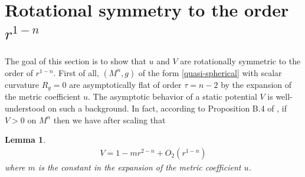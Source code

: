 \documentclass[12pt,twoside]{article}
\theoremstyle{plain}
\newtheorem{lem}[theorem]{Lemma}
\theoremstyle{definition}
\theoremstyle{remark}
\numberwithin{equation}{section}
\begin{document}
\section{Rotational symmetry to the order $r^{1-n}$}\label{section:rotational symmetry at the order}
The goal of this section is to show that $u$ and $V$ are rotationally symmetric to the order of $r^{1-n}$. First of all, $(M^{n},g)$ of the form \eqref{quasi-spherical} with scalar curvature $R_{g}=0$ are asymptotically flat of order $\tau = n-2$ by the expansion of the metric coefficient $u$. The asymptotic behavior of a static potential $V$ is well-understood on such a background. In fact, according to Proposition B.4 of \cite{HMM}, if $V >0$ on $M^{n}$ then we have after scaling that
\begin{lem}
\begin{align*}
    V = 1 - m r^{2-n} + O_2(r^{1-n})
\end{align*}
where $m$ is the constant in the expansion of the metric coefficient $u$.
\end{lem}
\end{document}
